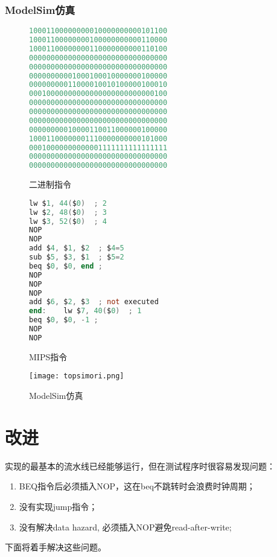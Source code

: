 \documentclass[a4paper]{article}
\begin{document}
\section{ModelSim仿真}
    \begin{figure}[h]
        \begin{minipage}[t]{0.54\linewidth}
        \centering
            \begin{lstlisting}[language={Verilog}]
10001100000000010000000000101100
10001100000000100000000000110000
10001100000000110000000000110100
00000000000000000000000000000000
00000000000000000000000000000000
00000000001000100010000000100000
00000000011000010010100000100010
00010000000000000000000000000100
00000000000000000000000000000000
00000000000000000000000000000000
00000000000000000000000000000000
00000000010000110011000000100000
10001100000001110000000000101000
00010000000000001111111111111111
00000000000000000000000000000000
00000000000000000000000000000000  \end{lstlisting}
        \caption{二进制指令}
        \end{minipage}%
        \begin{minipage}[t]{0.46\linewidth}
        \centering
            \begin{lstlisting}[language={Verilog}]
lw $1, 44($0)  ; 2
lw $2, 48($0)  ; 3
lw $3, 52($0)  ; 4
NOP
NOP
add $4, $1, $2  ; $4=5
sub $5, $3, $1  ; $5=2
beq $0, $0, end ;
NOP
NOP
NOP
add $6, $2, $3  ; not executed
end:    lw $7, 40($0)  ; 1
beq $0, $0, -1 ;
NOP
NOP   \end{lstlisting}
        \caption{MIPS指令}
        \end{minipage}
    \end{figure}

    \begin{figure}[h]
        \centering
        \texttt{[image: topsimori.png]}
        \caption{ModelSim仿真}
    \end{figure}


\newpage
\part{改进}
实现的最基本的流水线已经能够运行，但在测试程序时很容易发现问题：\\
    \begin{enumerate}
      \item BEQ指令后必须插入NOP，这在beq不跳转时会浪费时钟周期；
      \item 没有实现jump指令；
      \item 没有解决data hazard, 必须插入NOP避免read-after-write;
    \end{enumerate}
    下面将着手解决这些问题。
\end{document}
